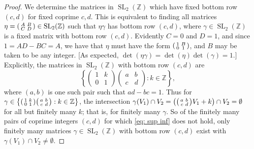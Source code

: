 \documentclass[10pt,leqno]{article}
\newcommand{\cbr}[1]{\left\{#1\right\}}
\DeclareMathOperator{\SL}{SL}
\begin{document}
\begin{proof}
    We determine the matrices in $\SL_2(\mathbb{Z})$ which have fixed bottom row $(c,d)$ for fixed coprime $c,d$. This is equivalent to finding all matrices $\eta = \begin{psmallmatrix}
        A & B \\ C & D
    \end{psmallmatrix}\in \SL_2(\mathbb{Z})$ such that $\eta\gamma$ has bottom row $(c,d)$, where $\gamma\in \SL_2(\mathbb{Z})$ is a fixed matrix with  bottom row $(c,d)$. Evidently $C=0$ and $D = 1$, and since $1 = AD - BC = A$, we have that $\eta$ must have the form $\begin{psmallmatrix}
        1 & B \\ 0  & 1
    \end{psmallmatrix}$, and $B$ may be taken to be any integer. [As expected, $\det(\eta\gamma) = \det(\eta)\det(\gamma) = 1$.] Explicitly, the matrices in $\SL_2(\mathbb{Z})$ with bottom row $(c,d)$ are \[\cbr{\begin{pmatrix}
        1 & k \\ 0 & 1
    \end{pmatrix}\begin{pmatrix}
        a & b \\ c & d
    \end{pmatrix}: k\in \mathbb{Z}},\]
    where $(a,b)$ is one such pair such that $ad-bc = 1$. Thus for $\gamma\in \cbr{\begin{psmallmatrix}
        1 & k \\ 0 & 1
    \end{psmallmatrix}\begin{psmallmatrix}
        a & b \\ c & d
    \end{psmallmatrix}: k\in \mathbb{Z}}$, the intersection $\gamma(V_1)\cap V_2 = \big(\begin{psmallmatrix}
        a & b \\ c & d
    \end{psmallmatrix}V_1+ k\big)\cap V_2 =\emptyset$ for all but finitely many $k$; that is, for finitely many $\gamma$. So of the finitely many pairs of coprime integers $(c,d)$ for which \cref{eq: sup inf} does not hold, only finitely many matrices $\gamma\in \SL_2(\mathbb{Z})$ with bottom row $(c,d)$ exist with $\gamma(V_1)\cap V_2\neq \emptyset$.


\end{proof}
\end{document}
